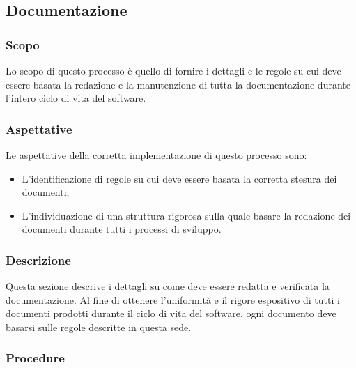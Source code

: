 \documentclass[../norme-di-progetto.tex]{subfiles}
\begin{document}
\subsection{Documentazione}
\subsubsection{Scopo}
Lo scopo di questo processo è quello di fornire i dettagli e le regole su cui deve essere basata la redazione e la manutenzione di tutta la documentazione durante l'intero ciclo di vita del software.

\subsubsection{Aspettative}
Le aspettative della corretta implementazione di questo processo sono:
\begin{itemize}
  \item L'identificazione di regole su cui deve essere basata la corretta stesura dei documenti;
  \item L'individuazione di una struttura rigorosa sulla quale basare la redazione dei documenti durante tutti i processi di sviluppo.
\end{itemize}

\subsubsection{Descrizione}
Questa sezione descrive i dettagli su come deve essere redatta e verificata la documentazione. Al fine di ottenere l'uniformità e il rigore espositivo di tutti i documenti prodotti durante il ciclo di vita del software, ogni documento deve basarsi sulle regole descritte in questa sede.

\subsubsection{Procedure}
\end{document}
